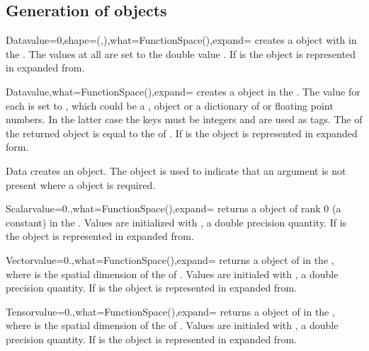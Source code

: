 \subsection{Generation of \Data objects}
\begin{classdesc}{Data}{value=0,shape=(,),what=FunctionSpace(),expand=\False}
creates a \Data object with \Shape {} in the \FunctionSpace {}.
The values at all \DataSamplePoints are set to the double value . If  is \True
the \Data object is represented in expanded from.
\end{classdesc}

\begin{classdesc}{Data}{value,what=FunctionSpace(),expand=\False}
creates a \Data object in the \FunctionSpace {}. 
The value for each \DataSamplePoints is set to , which could be a \numarray, \Data object  or a dictionary of 
\numarray or floating point numbers. In the latter case the keys must be integers and are used
as tags.
The \Shape of the returned object is equal to the \Shape of . If  is \True
the \Data object is represented in expanded form.
\end{classdesc}

\begin{classdesc}{Data}{}
creates an \EmptyData object. The \EmptyData object is used to indicate that an argument is not present
where a \Data object is required.
\end{classdesc}

\begin{funcdesc}{Scalar}{value=0.,what=FunctionSpace(),expand=\False}
returns a \Data object of rank 0 (a constant) in the \FunctionSpace {}.
Values are initialized with , a double precision quantity. If  is \True
the \Data object is represented in expanded from.
\end{funcdesc}

\begin{funcdesc}{Vector}{value=0.,what=FunctionSpace(),expand=\False}
returns a \Data object of \Shape {} in the \FunctionSpace {},
where  is the spatial dimension of the \Domain of .
Values are initialed with , a double precision quantity. If  is \True
the \Data object is represented in expanded from.
\end{funcdesc}

\begin{funcdesc}{Tensor}{value=0.,what=FunctionSpace(),expand=\False}
returns a \Data object of \Shape {} in the \FunctionSpace {},
where  is the spatial dimension of the \Domain of .
Values are initialed with , a double precision quantity. If  is \True
the \Data object is represented in expanded from.
\end{funcdesc}

